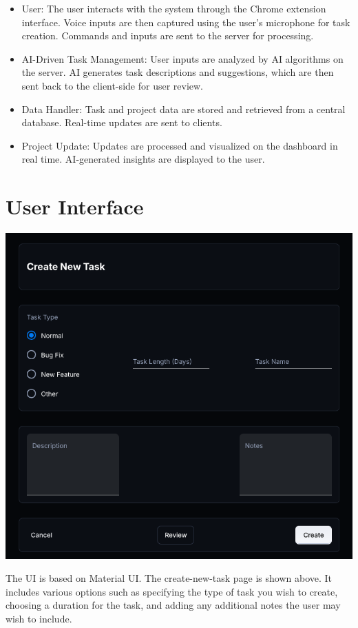 \documentclass{article}
\begin{document}
\begin{itemize}
    \item User: The user interacts with the system through the Chrome extension interface. Voice inputs are then captured using the user's microphone for task creation. Commands and inputs are sent to the server for processing.
    \item AI-Driven Task Management: User inputs are analyzed by AI algorithms on the server. AI generates task descriptions and suggestions, which are then sent back to the client-side for user review.
    \item Data Handler: Task and project data are stored and retrieved from a central database. Real-time updates are sent to clients.
    \item Project Update: Updates are processed and visualized on the dashboard in real time. AI-generated insights are displayed to the user.
\end{itemize}

\section{User Interface}

\includegraphics[width=0.9\linewidth]{../logo/mockup.png} 

The UI is based on Material UI\cite{mui}. The create-new-task page is shown above. It includes various options such as specifying the type of task you wish to create, choosing a duration for the task, and adding any additional notes the user may wish to include.
\end{document}
